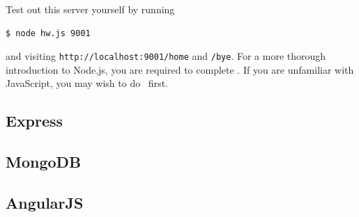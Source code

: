 \inputminted{js}{files/nodejs/hw.js}

Test out this server yourself by running

\begin{verbatim}
$ node hw.js 9001
\end{verbatim}

and visiting \texttt{http://localhost:9001/home} and  \texttt{/bye}. For a more
thorough introduction to Node.js, you are required to complete \learnyounode.
If you are unfamiliar with JavaScript, you may wish to do \javascripting\ first.

\subsection{Express}

\subsection{MongoDB}

\subsection{AngularJS}


